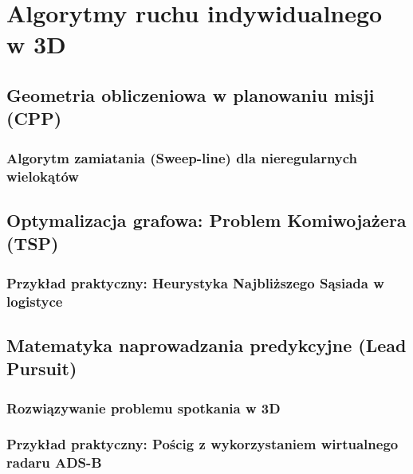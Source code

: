 \chapter{Algorytmy ruchu indywidualnego w 3D}
\section{Geometria obliczeniowa w planowaniu misji (CPP)}
\subsection{Algorytm zamiatania (Sweep-line) dla nieregularnych wielokątów}

\section{Optymalizacja grafowa: Problem Komiwojażera (TSP)}
\subsection{Przykład praktyczny: Heurystyka Najbliższego Sąsiada w logistyce}

\section{Matematyka naprowadzania predykcyjne (Lead Pursuit)}
\subsection{Rozwiązywanie problemu spotkania w 3D}
\subsection{Przykład praktyczny: Pościg z wykorzystaniem wirtualnego radaru ADS-B}

